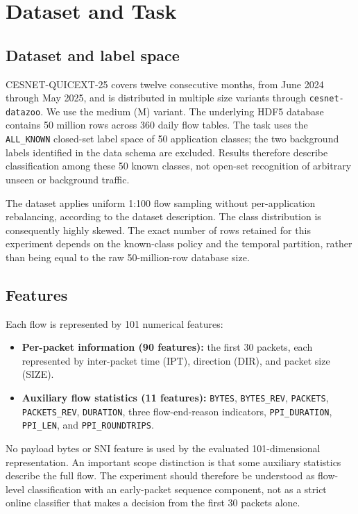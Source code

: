 \documentclass[conference]{IEEEtran}
\begin{document}
\section{Dataset and Task}
\label{sec:dataset}

\subsection{Dataset and label space}

CESNET-QUICEXT-25 covers twelve consecutive months, from June 2024 through May 2025, and is distributed in multiple size variants through \texttt{cesnet-datazoo}. We use the medium (M) variant. The underlying HDF5 database contains 50 million rows across 360 daily flow tables. The task uses the \texttt{ALL\_KNOWN} closed-set label space of 50 application classes; the two background labels identified in the data schema are excluded. Results therefore describe classification among these 50 known classes, not open-set recognition of arbitrary unseen or background traffic.

The dataset applies uniform 1:100 flow sampling without per-application rebalancing, according to the dataset description. The class distribution is consequently highly skewed. The exact number of rows retained for this experiment depends on the known-class policy and the temporal partition, rather than being equal to the raw 50-million-row database size.

\subsection{Features}

Each flow is represented by 101 numerical features:
\begin{itemize}
  \item \textbf{Per-packet information (90 features):} the first 30 packets, each represented by inter-packet time (IPT), direction (DIR), and packet size (SIZE).
  \item \textbf{Auxiliary flow statistics (11 features):} \texttt{BYTES}, \texttt{BYTES\_REV}, \texttt{PACKETS}, \texttt{PACKETS\_REV}, \texttt{DURATION}, three flow-end-reason indicators, \texttt{PPI\_DURATION}, \texttt{PPI\_LEN}, and \texttt{PPI\_ROUNDTRIPS}.
\end{itemize}
No payload bytes or SNI feature is used by the evaluated 101-dimensional representation. An important scope distinction is that some auxiliary statistics describe the full flow. The experiment should therefore be understood as flow-level classification with an early-packet sequence component, not as a strict online classifier that makes a decision from the first 30 packets alone.
\end{document}
